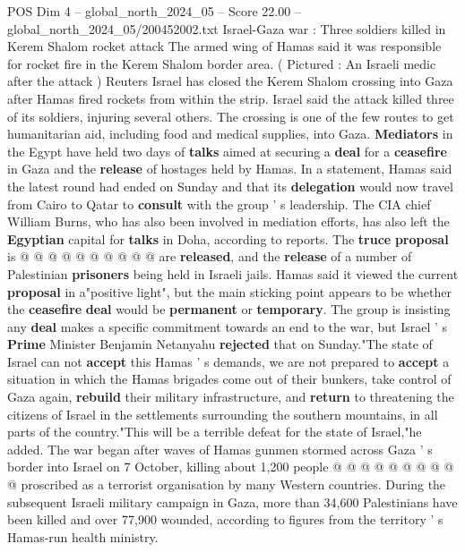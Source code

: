 \begin{textsample}{POS Dim 4 – global\_north\_2024\_05 – Score 22.00 – global\_north\_2024\_05/200452002.txt}  \label{ex:f4_pos_342}
Israel-Gaza war : Three soldiers killed in Kerem Shalom rocket attack The armed wing of Hamas said it was responsible for rocket fire in the Kerem Shalom border area. ( Pictured : An Israeli medic after the attack ) Reuters Israel has closed the Kerem Shalom crossing into Gaza after Hamas fired rockets from within the strip.
Israel said the attack killed three of its soldiers, injuring several others.
The crossing is one of the few routes to get humanitarian aid, including food and medical supplies, into Gaza. \textbf{Mediators} in the Egypt have held two days of \textbf{talks} aimed at securing a \textbf{deal} for a \textbf{ceasefire} in Gaza and the \textbf{release} of hostages held by Hamas.
In a statement, Hamas said the latest round had ended on Sunday and that its \textbf{delegation} would now travel from Cairo to Qatar to \textbf{consult} with the group ' s leadership.
The CIA chief William Burns, who has also been involved in mediation efforts, has also left the \textbf{Egyptian} capital for \textbf{talks} in Doha, according to reports.
The \textbf{truce} \textbf{proposal} is @ @ @ @ @ @ @ @ @ @ are \textbf{released}, and the \textbf{release} of a number of Palestinian \textbf{prisoners} being held in Israeli jails.
Hamas said it viewed the current \textbf{proposal} in a"positive light", but the main sticking point appears to be whether the \textbf{ceasefire} \textbf{deal} would be \textbf{permanent} or \textbf{temporary}.
The group is insisting any \textbf{deal} makes a specific commitment towards an end to the war, but Israel ' s \textbf{Prime} Minister Benjamin Netanyahu \textbf{rejected} that on Sunday."The state of Israel can not \textbf{accept} this Hamas ' s demands, we are not prepared to \textbf{accept} a situation in which the Hamas brigades come out of their bunkers, take control of Gaza again, \textbf{rebuild} their military infrastructure, and \textbf{return} to threatening the citizens of Israel in the settlements surrounding the southern mountains, in all parts of the country."This will be a terrible defeat for the state of Israel,"he added.
The war began after waves of Hamas gunmen stormed across Gaza ' s border into Israel on 7 October, killing about 1,200 people @ @ @ @ @ @ @ @ @ @ proscribed as a terrorist organisation by many Western countries.
During the subsequent Israeli military campaign in Gaza, more than 34,600 Palestinians have been killed and over 77,900 wounded, according to figures from the territory ' s Hamas-run health ministry.

\end{textsample}
